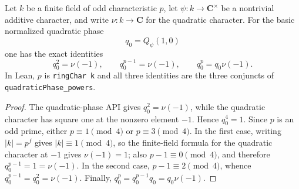 \begin{lemma}\label{mod:finitefield-q0powers}
Let $k$ be a finite field of odd characteristic $p$, let
$\psi:k\to\mathbf C^\times$ be a nontrivial additive character, and
write $\nu:k\to\mathbf C$ for the quadratic character.  For the basic
normalized quadratic phase
\[
 q_0=Q_\psi(1,0)
\]
one has the exact identities
\[
 q_0^2=\nu(-1),\qquad
 q_0^{p-1}=\nu(-1),\qquad
 q_0^p=q_0\nu(-1).
\]
In Lean, $p$ is \texttt{ringChar k} and all three identities are the
three conjuncts of \texttt{quadraticPhase\_powers}.
\leanok
{}
\FormalizationContract
\end{lemma}
\begin{proof}
The quadratic-phase API gives $q_0^2=\nu(-1)$, while the quadratic
character has square one at the nonzero element $-1$.  Hence
$q_0^4=1$.  Since $p$ is an odd prime, either $p\equiv1\pmod4$ or
$p\equiv3\pmod4$.  In the first case, writing $|k|=p^f$ gives
$|k|\equiv1\pmod4$, so the finite-field formula for the quadratic
character at $-1$ gives $\nu(-1)=1$; also $p-1\equiv0\pmod4$, and
therefore $q_0^{p-1}=1=\nu(-1)$.  In the second case,
$p-1\equiv2\pmod4$, whence $q_0^{p-1}=q_0^2=\nu(-1)$.  Finally,
$q_0^p=q_0^{p-1}q_0=q_0\nu(-1)$.
\end{proof}
